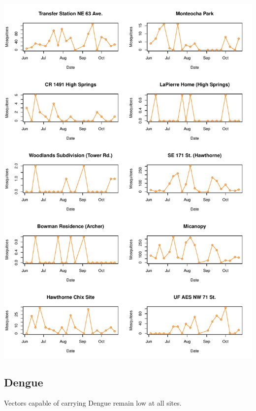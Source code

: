 \documentclass{article}
\begin{document}
\begin{center}
\includegraphics{mosq28oct13-012}
\newpage
\subsection*{Dengue}

\end{center}

Vectors capable of carrying Dengue remain low at all sites.\\
\end{document}
